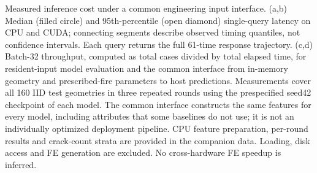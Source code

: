 \caption{Measured inference cost under a common engineering input interface. (a,b) Median (filled circle) and 95th-percentile (open diamond) single-query latency on CPU and CUDA; connecting segments describe observed timing quantiles, not confidence intervals. Each query returns the full 61-time response trajectory. (c,d) Batch-32 throughput, computed as total cases divided by total elapsed time, for resident-input model evaluation and the common interface from in-memory geometry and prescribed-fire parameters to host predictions. Measurements cover all 160 IID test geometries in three repeated rounds using the prespecified seed42 checkpoint of each model. The common interface constructs the same features for every model, including attributes that some baselines do not use; it is not an individually optimized deployment pipeline. CPU feature preparation, per-round results and crack-count strata are provided in the companion data. Loading, disk access and FE generation are excluded. No cross-hardware FE speedup is inferred.}
\label{fig:inference_efficiency}
